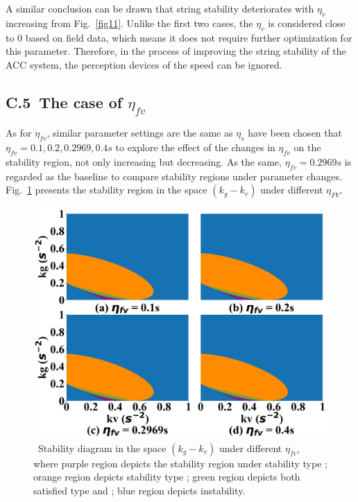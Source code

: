 \documentclass[a4paper]{cas-sc}
\begin{document}
A similar conclusion can be drawn that string stability deteriorates with $\eta_v$ increasing from Fig.~\ref{fig11}. Unlike the first two cases, the $\eta_v$ is considered close to 0 based on field data, which means it does not require further optimization for this parameter. Therefore, in the process of improving the string stability of the ACC system, the perception devices of the speed can be ignored.

\subsection*{C.5~The case of $\eta_{fv}$}

As for $\eta_{fv}$, similar parameter settings are the same as $\eta_s$ have been chosen that $\eta_{fv}=0.1,0.2,0.2969,0.4s$ to explore the effect of the changes in $\eta_{fv}$ on the stability region, not only increasing but decreasing. As the same, $\eta_{fv}=0.2969s$ is regarded as the baseline to compare stability regions under parameter changes. Fig.~\ref{fig12} presents the stability region in the space $(k_g-k_v)$ under different $\eta_{FV}$.

\begin{figure}
  \centering
  \includegraphics[width=14cm]{figs/fig12.png}
  \caption{~Stability diagram in the space $(k_g-k_v)$ under different $\eta_{fv}$, where purple region depicts the stability region under stability type \uppercase\expandafter{}; orange region depicts stability type \uppercase\expandafter{}; green region depicts both satisfied type \uppercase\expandafter{} and \uppercase\expandafter{}; blue region depicts instability.}
  \label{fig12}
\end{figure}
\end{document}
